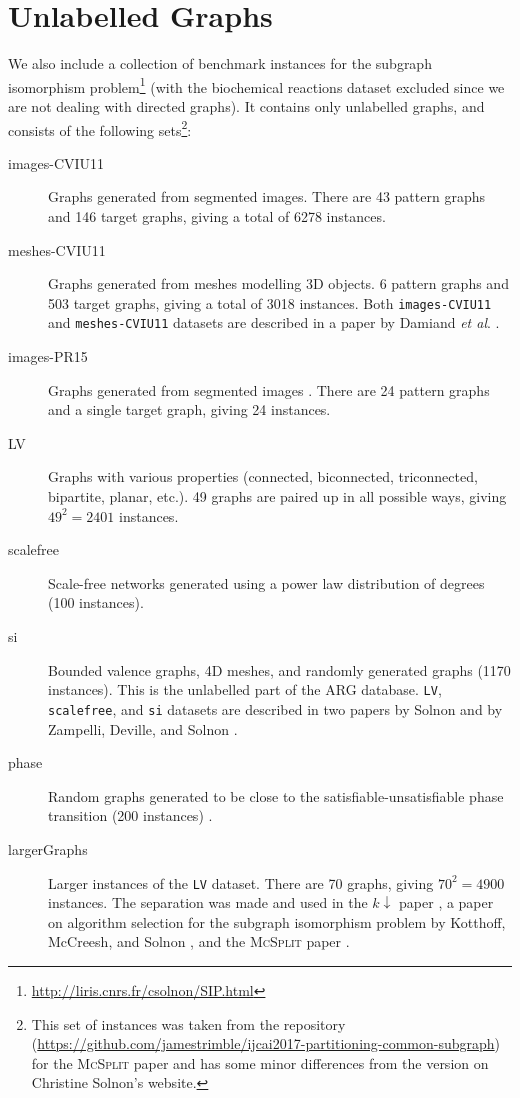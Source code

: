 \documentclass{l4proj}
\theoremstyle{definition}
\theoremstyle{remark}
\newcommand{\etal}{\textit{et al}.}
\begin{document}
\section{Unlabelled Graphs} \label{sec:unlabelled}

We also include a collection of benchmark instances for the subgraph isomorphism
problem\footnote{\url{http://liris.cnrs.fr/csolnon/SIP.html}} (with the
biochemical reactions dataset excluded since we are not dealing with directed
graphs). It contains only unlabelled graphs, and consists of the following
sets\footnote{This set of instances was taken from the repository
  (\url{https://github.com/jamestrimble/ijcai2017-partitioning-common-subgraph})
  for the \textsc{McSplit} paper \cite{DBLP:conf/ijcai/McCreeshPT17} and has
  some minor differences from the version on Christine Solnon's website.}:

\begin{description}
\item[images-CVIU11] Graphs generated from segmented images. There are 43
  pattern graphs and 146 target graphs, giving a total of \num{6278} instances.
\item[meshes-CVIU11] Graphs generated from meshes modelling 3D
  objects. 6 pattern graphs and 503 target graphs, giving a total of \num{3018}
  instances. Both \texttt{images-CVIU11} and \texttt{meshes-CVIU11} datasets are
  described in a paper by Damiand \etal{} \cite{DBLP:journals/cviu/DamiandSHJS11}.
\item[images-PR15] Graphs generated from segmented images
  \cite{DBLP:journals/pr/SolnonDHJ15}. There are 24 pattern graphs and a single
  target graph, giving 24 instances.
\item[LV] Graphs with various properties (connected, biconnected, triconnected,
  bipartite, planar, etc.). 49 graphs are paired up in all possible ways, giving
  $49^2=\num{2401}$ instances.
\item[scalefree] Scale-free networks generated using a power law distribution of
  degrees (100 instances).
\item[si] Bounded valence graphs, 4D meshes, and randomly generated graphs
  (\num{1170} instances). This is the unlabelled part of the ARG database.
  \texttt{LV}, \texttt{scalefree}, and \texttt{si} datasets are described in
  two papers by Solnon \cite{DBLP:journals/ai/Solnon10} and by Zampelli,
  Deville, and Solnon \cite{DBLP:journals/constraints/ZampelliDS10}.
\item[phase] Random graphs generated to be close to the
  satisfiable-unsatisfiable phase transition (200 instances)
  \cite{DBLP:conf/ijcai/McCreeshPT16}.
\item[largerGraphs] Larger instances of the \texttt{LV} dataset. There are 70
  graphs, giving $70^2=\num{4900}$ instances. The separation was made and used
  in the $k{\downarrow}$ paper \cite{DBLP:conf/aaai/HoffmannMR17}, a paper on
  algorithm selection for the subgraph isomorphism problem by Kotthoff,
  McCreesh, and Solnon \cite{DBLP:conf/lion/KotthoffMS16}, and the
  \textsc{McSplit} paper \cite{DBLP:conf/ijcai/McCreeshPT17}.
\end{description}
\end{document}
